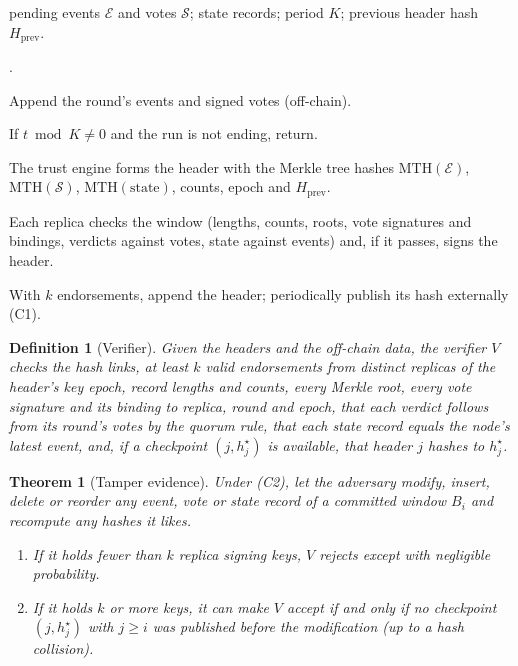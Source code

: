 \documentclass[lineno,pdflatex,sn-nature]{sn-jnl}
\theoremstyle{thmstyleone}%
\newtheorem{theorem}{Theorem}%
\theoremstyle{thmstylethree}%
\newtheorem{definition}{Definition}%
\begin{document}
\begin{algorithm}[!t]
\caption{Audit-log commit at round $t$.}
\label{alg:anchor}
 pending events $\mathcal{E}$ and votes
$\mathcal{S}$; state records; period $K$; previous header hash
$H_{\mathrm{prev}}$.

\begin{list}{.}{\setlength{\topsep}{1pt}\setlength{\partopsep}{0pt}\setlength{\itemsep}{0pt}\setlength{\parsep}{0pt}\setlength{\leftmargin}{1.6em}\setlength{\labelwidth}{1.2em}\setlength{\labelsep}{0.4em}}
  \item Append the round's events and signed votes (off-chain).
  \item If $t \bmod K \neq 0$ and the run is not ending, return.
  \item The trust engine forms the header with the Merkle tree hashes
        $\mathrm{MTH}(\mathcal{E})$, $\mathrm{MTH}(\mathcal{S})$,
        $\mathrm{MTH}(\text{state})$, counts, epoch and
        $H_{\mathrm{prev}}$.
  \item Each replica checks the window (lengths, counts, roots, vote
        signatures and bindings, verdicts against votes, state against
        events) and, if it passes, signs the header.
  \item With $k$ endorsements, append the header; periodically
        publish its hash externally (C1).
\end{list}\vspace{-2pt}
\end{algorithm}

\begin{definition}[Verifier]
Given the headers and the off-chain data, the verifier $V$ checks the
hash links, at least $k$ valid endorsements from distinct replicas of
the header's key epoch, record lengths and counts, every Merkle root,
every vote signature and its binding to replica, round and epoch, that
each verdict follows from its round's votes by the quorum rule, that
each state record equals the node's latest event, and, if a checkpoint
$(j,h^{\star}_j)$ is available, that header $j$ hashes to $h^{\star}_j$.
\end{definition}

\begin{theorem}[Tamper evidence]\label{thm:tamper}
Under (C2), let the adversary modify, insert, delete or reorder any
event, vote or state record of a committed window $B_i$ and recompute
any hashes it likes.
\begin{enumerate}
\item If it holds fewer than $k$ replica signing keys, $V$ rejects
except with negligible probability.
\item If it holds $k$ or more keys, it can make $V$ accept if and only
if no checkpoint $(j,h^{\star}_j)$ with $j\ge i$ was published before
the modification (up to a hash collision).
\end{enumerate}
\end{theorem}
\end{document}
